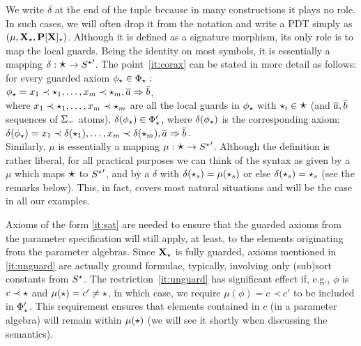 %
We write $\delta$ at the end of the tuple because in many constructions it
plays no role. In such cases, we will often drop it from the notation and
write a PDT simply as $(\mu,{\bf X_\star},{\bf P[X]_\star})$. Although it is defined as a signature morphism,
its only role is to map the local guards. Being  the identity on most
symbols, it is essentially a mapping
$\delta:\mbox{\Large{$\star$}}\to{S^\star}'$. The point~\ref{it:corax} can be stated in more
detail as follows: for every guarded axiom $\phi_\star\in\Phi_\star:$ \\
\hspace*{2em} $\phi_\star =x_1\prec\star_1, \ldots ,x_m\prec\star_m, \overline{a}
 \Rightarrow \overline{b}$, \\ where
$x_1\prec\star_1,\ldots,x_m\prec\star_m$ are all the local guards in
$\phi_\star$ with $\star_i\in\mbox{\Large{$\star$}}$ (and $\overline{a}, \overline{b}$ sequences of $\Sigma_-$
atoms), 
$\delta(\phi_\star)\in\Phi'_\star$,
where $\delta(\phi_\star)$ is the corresponding axiom:\\
\hspace*{1.5em}$\delta(\phi_\star)=x_1\prec\delta(\star_1),
\ldots ,x_m\prec\delta(\star_m),\overline{a} \Rightarrow \overline{b}$.
\\
Similarly, $\mu$ is essentially a mapping $\mu:\mbox{\Large{$\star$}}\to{S^\star}'$. 
Although the definition is rather liberal, for all practical purposes we can
think of the syntax as given by a $\mu$ which maps $\mbox{\Large{$\star$}}$ to ${S^\star}'$,
and by a $\delta$ with
$\delta(\star_s)=\mu(\star_s)$ or else
$\delta(\star_s)=\star_s$ (see the remarks below). This, in fact, covers most natural situations and
will be the case in all our examples.

Axioms of the form \ref{it:sat} are needed to ensure that the guarded axioms
from the parameter specification will still apply, at least, to the elements originating
from the parameter algebras. Since ${\bf X_\star}$ is fully guarded, axioms
mentioned in \ref{it:unguard} are actually ground formulae, typically,
involving only (sub)sort constants from $S^\star$. The
restriction~\ref{it:unguard} has significant effect if, e.g., $\phi$ is
$c\prec\star$ and $\mu(\star)=c'\not=\star$, in which case, we require
$\mu(\phi)=c\prec c'$ to be included in $\Phi'_\star$.
This requirement ensures that elements contained in
$c$ (in a parameter algebra) will remain within $\mu(\star)$ (we will see it
shortly when discussing the semantics).

